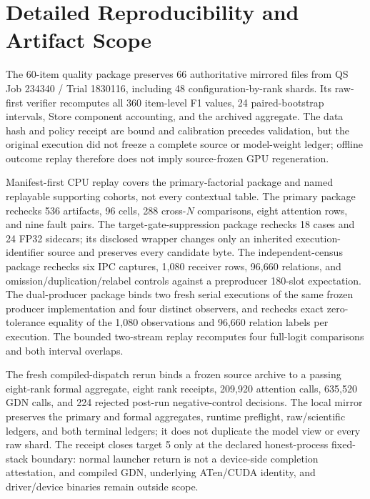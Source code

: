 \documentclass{article}
\begin{document}



\appendix

\section{Detailed Reproducibility and Artifact Scope}
\label{app:reproducibility}

The 60-item quality package preserves 66 authoritative mirrored files from QS
Job 234340 / Trial 1830116, including 48 configuration-by-rank shards.  Its
raw-first verifier recomputes all 360 item-level F1 values, 24 paired-bootstrap
intervals, Store component accounting, and the archived aggregate.  The data
hash and policy receipt are bound and calibration precedes validation, but the
original execution did not freeze a complete source or model-weight ledger;
offline outcome replay therefore does not imply source-frozen GPU regeneration.

Manifest-first CPU replay covers the primary-factorial package and named
replayable supporting cohorts, not every contextual table.  The primary package
rechecks 536 artifacts, 96 cells, 288 cross-$N$ comparisons, eight attention
rows, and nine fault pairs.  The target-gate-suppression package rechecks 18
cases and 24 FP32 sidecars; its disclosed wrapper changes only an inherited
execution-identifier source and preserves every candidate byte.  The
independent-census package rechecks six IPC captures, 1,080 receiver rows,
96,660 relations, and omission/duplication/relabel controls against a
preproducer 180-slot expectation.  The dual-producer package binds two fresh
serial executions of the same frozen producer implementation and four distinct
observers, and rechecks exact zero-tolerance equality of the 1,080 observations
and 96,660 relation labels per execution.  The
bounded two-stream replay recomputes four full-logit comparisons and both
interval overlaps.

The fresh compiled-dispatch rerun binds a frozen source archive to a passing
eight-rank formal aggregate, eight rank receipts, 209,920 attention calls,
635,520 GDN calls, and 224 rejected post-run negative-control decisions.  The
local mirror preserves the primary and formal aggregates, runtime preflight,
raw/scientific ledgers, and both terminal ledgers; it does not duplicate the
model view or every raw shard.  The receipt closes target 5 only at the
declared honest-process fixed-stack boundary: normal launcher return is not a
device-side completion attestation, and compiled GDN, underlying ATen/CUDA
identity, and driver/device binaries remain outside scope.
\end{document}
